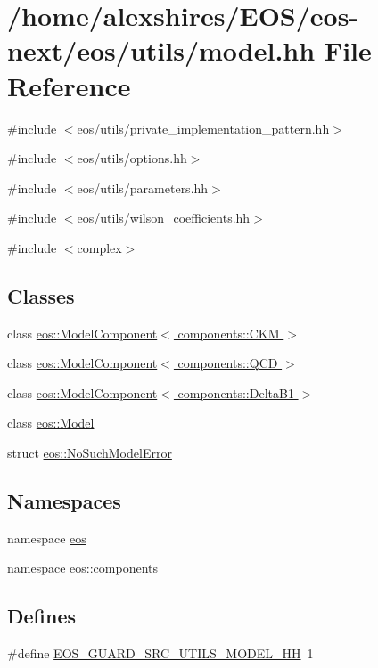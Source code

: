 \hypertarget{model_8hh}{
\section{/home/alexshires/EOS/eos-\/next/eos/utils/model.hh File Reference}
\label{model_8hh}
}
{\ttfamily \#include $<$eos/utils/private\_\-implementation\_\-pattern.hh$>$}\par
{\ttfamily \#include $<$eos/utils/options.hh$>$}\par
{\ttfamily \#include $<$eos/utils/parameters.hh$>$}\par
{\ttfamily \#include $<$eos/utils/wilson\_\-coefficients.hh$>$}\par
{\ttfamily \#include $<$complex$>$}\par
\subsection*{Classes}
\begin{DoxyCompactItemize}
\item 
class \hyperlink{classeos_1_1ModelComponent_3_01components_1_1CKM_01_4}{eos::ModelComponent$<$ components::CKM $>$}
\item 
class \hyperlink{classeos_1_1ModelComponent_3_01components_1_1QCD_01_4}{eos::ModelComponent$<$ components::QCD $>$}
\item 
class \hyperlink{classeos_1_1ModelComponent_3_01components_1_1DeltaB1_01_4}{eos::ModelComponent$<$ components::DeltaB1 $>$}
\item 
class \hyperlink{classeos_1_1Model}{eos::Model}
\item 
struct \hyperlink{structeos_1_1NoSuchModelError}{eos::NoSuchModelError}
\end{DoxyCompactItemize}
\subsection*{Namespaces}
\begin{DoxyCompactItemize}
\item 
namespace \hyperlink{namespaceeos}{eos}
\item 
namespace \hyperlink{namespaceeos_1_1components}{eos::components}
\end{DoxyCompactItemize}
\subsection*{Defines}
\begin{DoxyCompactItemize}
\item 
\#define \hyperlink{model_8hh_a840a218887d25b75651ba408ae261e9d}{EOS\_\-GUARD\_\-SRC\_\-UTILS\_\-MODEL\_\-HH}~1
\end{DoxyCompactItemize}


